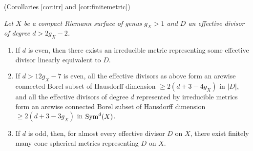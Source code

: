 \documentclass[12pt]{article}
\begin{document}
 (Corollaries \ref{cor:irr} and \ref{cor:finitemetric})
{\it Let $X$ be a compact Riemann surface of genus $g_X>1$ and $D$ an effective divisor of degree $d>2g_X-2$.
\begin{enumerate}

\item If $d$ is even, then there exists an irreducible metric representing some effective divisor linearly equivalent to $D$.

\item If $d>12g_X-7$ is even, all the effective divisors as above form an arcwise connected Borel subset of Hausdorff dimension $\geq 2(d+3-4g_X)$ in $|D|$, and all the effective divisors of degree $d$ represented by irreducible metrics form an arcwise connected Borel subset of Hausdorff dimension $\geq 2(d+3-3g_X)$ in ${\rm Sym}^d(X)$.

\item If $d$ is odd, then, for almost every effective divisor $D$ on $X$, there exist finitely many cone spherical metrics representing $D$ on $X$.
\end{enumerate}}

\begin{figure}[omitted: a diagram of this paper's results, not reproduced here]\label{fig:Leitfaden}\end{figure}
\end{document}
